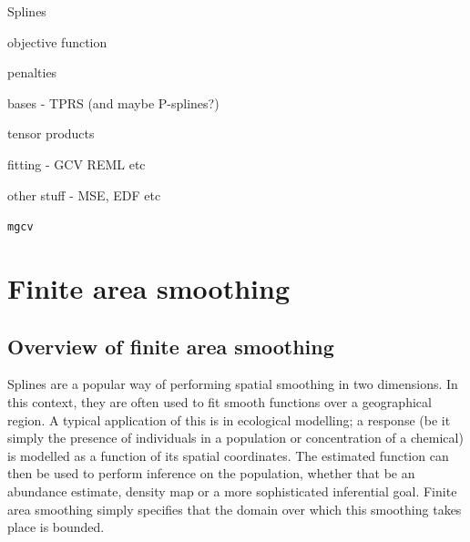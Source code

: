 \bi
\item Splines
\item objective function
\label{GAMobjfcn}
\item penalties
\label{GAMpenalties}
\item bases - TPRS (and maybe P-splines?)
\label{GAMtprs}
\label{GAMtprspenalty}
\item tensor products
\label{GAMtensor}
\item fitting - GCV REML etc
\label{GAMGCV}
\item other stuff - MSE, EDF etc
\item \texttt{mgcv}
%	
%	
%
\ei

\section{Finite area smoothing}

\subsection{Overview of finite area smoothing}

Splines are a popular way of performing spatial smoothing in two dimensions. In this context, they are often used to fit smooth functions over a geographical region. A typical application of this is in ecological modelling; a response (be it simply the presence of individuals in a population or concentration of a chemical) is modelled as a function of its spatial coordinates. The estimated function can then be used to perform inference on the population, whether that be an abundance estimate, density map or a more sophisticated inferential goal. Finite area smoothing simply specifies that the domain over which this smoothing takes place is bounded.

